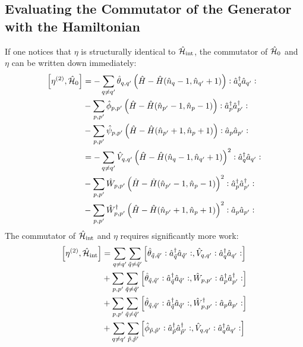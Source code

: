 \begin{appendix}
\subsection{Evaluating the Commutator of the Generator with the Hamiltonian}
If one notices that $\eta$ is structurally identical to $\hat{\mathcal{H}}_{\mathrm{int}}$, the commutator of $\hat{\mathcal{H}}_0$ and $\eta$ can be written down immediately:
\begin{align}
\left[\eta^{(2)},\hat{\mathcal{H}}_0\right] &= -\sum\limits_{q\neq q^\prime}\hat \theta_{q,q^\prime} \left(\hat H - \hat H(\hat n_q-1,\hat n_{q^\prime}+1)\right) \vcentcolon \hat a^\dagger_q\hat a_{q^\prime}\vcentcolon \\
&-\sum\limits_{p,p^\prime}\hat \phi_{p,p^\prime}\left(\hat H-\hat H(\hat n_{p^\prime}-1,\hat n_p -1)\right)\vcentcolon \hat a^\dagger_p\hat a^\dagger_{p^\prime}\vcentcolon\nonumber\\
&- \sum\limits_{p,p^\prime}\hat \psi_{p,p^\prime}\left(\hat H-\hat H(\hat n_{p^\prime}+1,\hat n_p +1)\right)\vcentcolon \hat a_p\hat a_{p^\prime}\vcentcolon\nonumber\\
&= - \sum\limits_{q\neq q^\prime}\hat V_{q,q^\prime} \left(\hat H - \hat H(\hat n_q-1,\hat n_{q^\prime}+1)\right)^2 \vcentcolon \hat a^\dagger_q\hat a_{q^\prime}\vcentcolon \\
&-\sum\limits_{p,p^\prime}\hat W_{p,p^\prime}\left(\hat H-\hat H(\hat n_{p^\prime}-1,\hat n_p -1)\right)^2\vcentcolon \hat a^\dagger_p\hat a^\dagger_{p^\prime}\vcentcolon\nonumber\\
&- \sum\limits_{p,p^\prime}\hat W_{p,p^\prime}^\dagger\left(\hat H-\hat H(\hat n_{p^\prime}+1,\hat n_p +1)\right)^2\vcentcolon \hat a_p\hat a_{p^\prime}\vcentcolon\nonumber
\end{align}
The commutator of $\hat{\mathcal{H}}_{\mathrm{int}}$ and $\eta$ requires significantly more work:
\begin{subequations}
\begin{align}
\left[\eta^{(2)},\ham_{\mathrm{int}}\right] &= \Sum_{q\neq q^\prime}\Sum_{\tilde q\neq\tilde q^\prime} \left[\hat\theta_{\tilde q,\tilde q^\prime}\NO\CR_{\tilde q}\AN_{\tilde q^\prime}\NO,\hat V_{q,q^\prime}\NO\CR_q\AN_{q^\prime}\NO\right] \label{com_eta_Hint_A} \\
&+ \Sum_{p, p^\prime}\Sum_{\tilde q\neq\tilde q^\prime} \left[\hat\theta_{\tilde q,\tilde q^\prime}\NO\CR_{\tilde q}\AN_{\tilde q^\prime}\NO,\hat W_{p,p^\prime}\NO\CR_p\CR_{p^\prime}\NO\right] \label{com_eta_Hint_B} \\
&+ \Sum_{p, p^\prime}\Sum_{\tilde q\neq\tilde q^\prime} \left[\hat\theta_{\tilde q,\tilde q^\prime}\NO\CR_{\tilde q}\AN_{\tilde q^\prime}\NO,\hat W_{p,p^\prime}^\dagger\NO\AN_p\AN_{p^\prime}\NO\right] \label{com_eta_Hint_C} \\
&+ \Sum_{q\neq q^\prime}\Sum_{\tilde p,\tilde p^\prime} \left[\hat\phi_{\tilde p,\tilde p^\prime}\NO\CR_{\tilde p}\CR_{\tilde p^\prime}\NO,\hat V_{q,q^\prime}\NO\CR_q\AN_{q^\prime}\NO\right] \label{com_eta_Hint_D} \\

\end{align}
\end{subequations}
\end{appendix}
